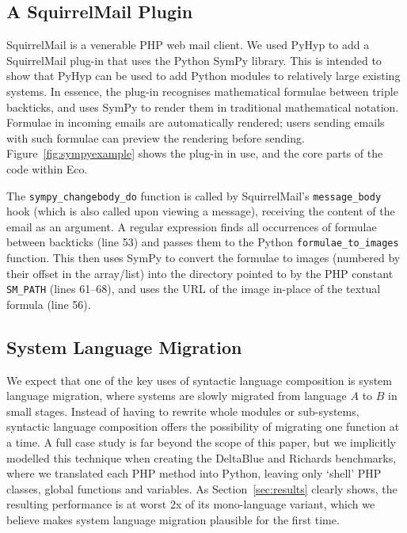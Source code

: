 \documentclass[a4paper,UKenglish]{lipics-v2016}
\newcommand{\ourvm}{PyHyp\xspace}
\begin{document}
\subsection{A SquirrelMail Plugin}

SquirrelMail is a venerable PHP web mail client. We used
\ourvm to add a SquirrelMail plug-in that uses the Python SymPy library.
This is intended to show
that \ourvm can be used to add Python modules to relatively large existing systems. In
essence, the plug-in recognises mathematical formulae between triple backticks,
and uses SymPy to render them in traditional mathematical notation. Formulae
in incoming emails are automatically rendered; users
sending emails with such formulae can preview the rendering before sending.
Figure~\ref{fig:sympyexample} shows the plug-in in use, and the core parts of the
code within Eco.

The \texttt{sym\-py\-\_changebody\_do} function is called by SquirrelMail's
\texttt{mess\-age\_body} hook (which is also called upon viewing a message),
receiving the content of the email as an argument. A regular expression finds
all occurrences of formulae between backticks (line 53) and passes them to the
Python \texttt{formulae\-\_to\-\_images} function. This then uses SymPy to convert
the formulae to images (numbered by their offset in the array/list) into the
directory pointed to by the PHP constant \texttt{SM\_PATH} (lines 61--68), and
uses the URL of the image in-place of the textual formula (line 56).


\subsection{System Language Migration}
\label{sec:migration}

We expect that one of the key uses of syntactic language composition
is system language migration, where systems are slowly migrated from language
$A$ to $B$ in small stages. Instead of having to rewrite whole modules or
sub-systems, syntactic language composition offers the possibility of migrating
one function at a time. A full case study is far beyond the scope of this
paper, but we implicitly modelled this technique when creating the DeltaBlue and
Richards benchmarks, where we translated each PHP method into Python, leaving only
`shell' PHP classes, global functions and variables. As
Section~\ref{sec:results} clearly shows, the resulting performance is at worst
2x of its mono-language variant, which we believe makes system language migration plausible
for the first time.
\end{document}
